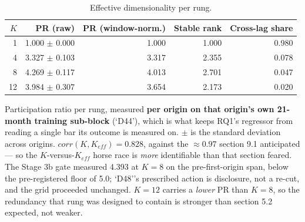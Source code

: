 \begin{table}[!t]
\centering
\caption{Effective dimensionality per rung.}
\label{tab:keff}
\begin{tabular}{rrrrr}
\toprule
$K$ & PR (raw) & PR (window-norm.) & Stable rank & Cross-lag share \\
\midrule
1 & 1.000 $\pm$ 0.000 & 1.000 & 1.000 & 0.980 \\
4 & 3.327 $\pm$ 0.103 & 3.317 & 2.355 & 0.078 \\
8 & 4.269 $\pm$ 0.117 & 4.013 & 2.701 & 0.047 \\
12 & 3.984 $\pm$ 0.307 & 3.654 & 2.173 & 0.020 \\
\bottomrule
\end{tabular}
\vspace{2pt}\par\footnotesize Participation ratio per rung, measured \textbf{per origin on that origin's own 21-month training sub-block} (`D44'), which is what keeps RQ1's regressor from reading a single bar its outcome is measured on. $\pm$ is the standard deviation across origins. $corr(K, K_{eff}) = 0.828$, against the $\approx 0.97$ section 9.1 anticipated --- so the $K$-versus-$K_{eff}$ horse race is \emph{more} identifiable than that section feared. The Stage 3b gate measured 4.393 at $K=8$ on the pre-first-origin span, below the pre-registered floor of 5.0; `D48''s prescribed action is disclosure, not a re-cut, and the grid proceeded unchanged. $K=12$ carries a \emph{lower} PR than $K=8$, so the redundancy that rung was designed to contain is stronger than section 5.2 expected, not weaker.
\end{table}
